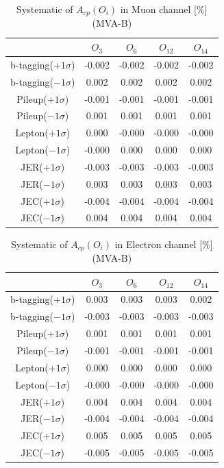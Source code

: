 		\begin{center}
		\setlength{\tabcolsep}{12pt}
		\begin{longtable}{ | c | c c c c | }
		\caption{Systematic of $A_{cp}(O_i)$ in Muon channel [\%] (MVA-B)}\\
		\hline
		 [\%] & $O_3$ & $O_6$ & $O_{12}$ & $O_{14}$ \\
		\hline
		b-tagging($+1\sigma$) & -0.002 & -0.002 & -0.002 & -0.002 \\
		b-tagging($-1\sigma$) & 0.002 & 0.002 & 0.002 & 0.002 \\
		\hline
		Pileup($+1\sigma$) & -0.001 & -0.001 & -0.001 & -0.001 \\
		Pileup($-1\sigma$) & 0.001 & 0.001 & 0.001 & 0.001 \\
		\hline
		Lepton($+1\sigma$) & 0.000 & -0.000 & -0.000 & -0.000 \\
		Lepton($-1\sigma$) & -0.000 & 0.000 & 0.000 & 0.000 \\
		\hline
		JER($+1\sigma$) & -0.003 & -0.003 & -0.003 & -0.003 \\
		JER($-1\sigma$) & 0.003 & 0.003 & 0.003 & 0.003 \\
		\hline
		JEC($+1\sigma$) & -0.004 & -0.004 & -0.004 & -0.004 \\
		JEC($-1\sigma$) & 0.004 & 0.004 & 0.004 & 0.004 \\
		\hline
		\end{longtable}
		\end{center}

		\begin{center}
		\setlength{\tabcolsep}{12pt}
		\begin{longtable}{ | c | c c c c | }
		\caption{Systematic of $A_{cp}(O_i)$ in Electron channel [\%] (MVA-B)}\\
		\hline
		 [\%] & $O_3$ & $O_6$ & $O_{12}$ & $O_{14}$ \\
		\hline
		b-tagging($+1\sigma$) & 0.003 & 0.003 & 0.003 & 0.002 \\
		b-tagging($-1\sigma$) & -0.003 & -0.003 & -0.003 & -0.003 \\
		\hline
		Pileup($+1\sigma$) & 0.001 & 0.001 & 0.001 & 0.001 \\
		Pileup($-1\sigma$) & -0.001 & -0.001 & -0.001 & -0.001 \\
		\hline
		Lepton($+1\sigma$) & 0.000 & 0.000 & 0.000 & 0.000 \\
		Lepton($-1\sigma$) & -0.000 & -0.000 & -0.000 & -0.000 \\
		\hline
		JER($+1\sigma$) & 0.004 & 0.004 & 0.004 & 0.004 \\
		JER($-1\sigma$) & -0.004 & -0.004 & -0.004 & -0.004 \\
		\hline
		JEC($+1\sigma$) & 0.005 & 0.005 & 0.005 & 0.005 \\
		JEC($-1\sigma$) & -0.005 & -0.005 & -0.005 & -0.005 \\
		\hline
		\end{longtable}
		\end{center}

\FloatBarrier
